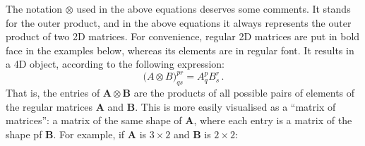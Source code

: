 The notation $\otimes$ used in the above equations deserves some comments.
It stands for the outer product, and in the above equations it always represents the outer product of two 2D matrices.
For convenience, regular 2D matrices are put in bold face in the examples below, whereas its elements are in regular font.
It results in a 4D object, according to the following expression:
\begin{equation}
  \big( A \otimes B \big)^{pr}_{qs} = A^p_q B^r_s\,.
\end{equation}
That is, the entries of $\mathbf{A} \otimes \mathbf{B}$ are the products of all possible pairs of elements of the regular matrices $\mathbf{A}$ and $\mathbf{B}$.
This is more easily visualised as a ``matrix of matrices'':
a matrix of the same shape of $\mathbf{A}$, where each entry is a matrix of the shape pf $\mathbf{B}$.
For example, if $\mathbf{A}$ is $3 \times 2$ and $\mathbf{B}$ is $2 \times 2$:

